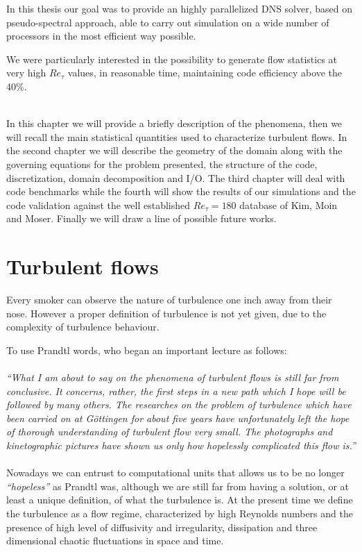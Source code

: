 In this thesis our goal was to provide an highly parallelized DNS solver, based on pseudo-spectral approach, able to carry out simulation on a wide number of processors in the most efficient way possible. \par
We were particularly interested in the possibility to generate flow statistics at very high $Re_{\tau}$ values, in reasonable time, maintaining code efficiency above the 40\%. \\~\par

In this chapter we will provide a briefly description of the phenomena, then we will recall the main statistical quantities used to characterize turbulent flows. In the second chapter we will describe the geometry of the domain along with the governing equations for the problem presented, the structure of the code, discretization, domain decomposition and I/O.
The third chapter will deal with code benchmarks while the fourth will show the results of our simulations and the code validation against the well established $Re_{\tau}=180$ database of Kim, Moin and Moser. Finally we will draw a line of possible future works.

\section{Turbulent flows}
Every smoker can observe the nature of turbulence one inch away from their nose.
However a proper definition of turbulence is not yet given, due to the complexity of turbulence behaviour. \par
To use Prandtl words, who began an important lecture as follows: \\~\\
\emph{``What I am about to say on the phenomena of turbulent flows is still far from conclusive. It concerns, rather, the first steps in a new path which I hope will be followed by many others. The researches on the problem of turbulence which have been carried on at G\"{o}ttingen for about five years have unfortunately left the hope of thorough understanding of turbulent flow very small. The photographs and kinetographic pictures have shown us only how hopelessly complicated this flow is.''} \\~\\

Nowadays we can entrust to computational units that allows us to be no longer \emph{``hopeless''} as Prandtl was, although we are still far from having a solution, or at least a unique definition, of what the turbulence is. 
At the present time we define the turbulence as a flow regime, characterized by high Reynolds numbers and the presence of high level of diffusivity and irregularity, dissipation and three dimensional chaotic fluctuations in space and time\cite{turbulence:def}.

